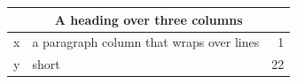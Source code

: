\documentclass{article}
\begin{document}
\begin{center}
\begin{tabular}{|l|p{3cm}|r|}
\hline
\multicolumn{3}{|c|}{A heading over three columns} \\
\hline
x & a paragraph column that wraps over lines & 1 \\
y & short & 22 \\
\hline
\end{tabular}
\end{center}
\end{document}
